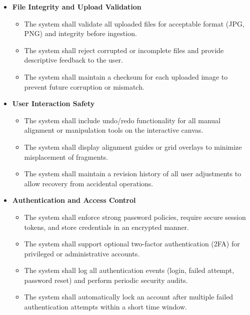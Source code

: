 \documentclass{article}
\begin{document}
\begin{itemize}

    \item \textbf{File Integrity and Upload Validation}
    \begin{itemize}
        \item The system shall validate all uploaded files for acceptable format (JPG, PNG) and integrity before ingestion.
        \item The system shall reject corrupted or incomplete files and provide descriptive feedback to the user.
        \item The system shall maintain a checksum for each uploaded image to prevent future corruption or mismatch.
    \end{itemize}

    \item \textbf{User Interaction Safety}
    \begin{itemize}
        \item The system shall include undo/redo functionality for all manual alignment or manipulation tools on the interactive canvas.
        \item The system shall display alignment guides or grid overlays to minimize misplacement of fragments.
        \item The system shall maintain a revision history of all user adjustments to allow recovery from accidental operations.
    \end{itemize}

    \item \textbf{Authentication and Access Control}
    \begin{itemize}
        \item The system shall enforce strong password policies, require secure session tokens, and store credentials in an encrypted manner.
        \item The system shall support optional two-factor authentication (2FA) for privileged or administrative accounts.
        \item The system shall log all authentication events (login, failed attempt, password reset) and perform periodic security audits.
        \item The system shall automatically lock an account after multiple failed authentication attempts within a short time window.
    \end{itemize}


\end{itemize}
\end{document}

